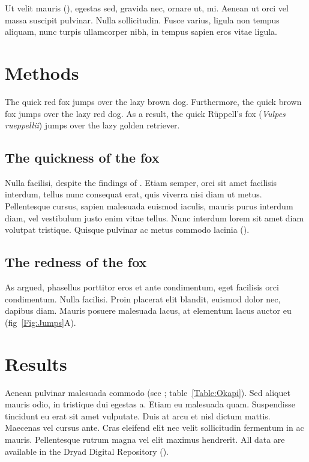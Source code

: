 \documentclass[11pt]{article}
\begin{document}
Ut velit mauris (\citealt{Xiao2015}), egestas sed, gravida nec, ornare 
ut, mi. Aenean ut orci vel massa suscipit pulvinar. Nulla sollicitudin. 
Fusce varius, ligula non tempus aliquam, nunc turpis ullamcorper nibh, 
in tempus sapien eros vitae ligula. 


\section*{Methods}

The quick red fox jumps over the lazy brown dog. Furthermore, the quick 
brown fox jumps over the lazy red dog. As a result, the quick 
R\"{u}ppell's fox (\textit{Vulpes rueppellii}) jumps over the lazy 
golden retriever.

\subsection*{The quickness of the fox}

Nulla facilisi, despite the findings of \citet{LemKapEx07}. Etiam 
semper, orci sit amet facilisis interdum, tellus nunc consequat erat, 
quis viverra nisi diam ut metus. Pellentesque cursus, sapien malesuada 
euismod iaculis, mauris purus interdum diam, vel vestibulum justo enim 
vitae tellus. Nunc interdum lorem sit amet diam volutpat tristique. 
Quisque pulvinar ac metus commodo lacinia (\citealt{Ing11,Xiao2015}).  

\subsection*{The redness of the fox}

As \citet{Xiao2015} argued, phasellus porttitor eros et ante 
condimentum, eget facilisis orci condimentum. Nulla facilisi. Proin 
placerat elit blandit, euismod dolor nec, dapibus diam. Mauris posuere 
malesuada lacus, at elementum lacus auctor eu (fig~\ref{Fig:Jumps}A). 

\section*{Results}

Aenean pulvinar malesuada commodo (see \citealt{DavisEtAl2011}; 
table~\ref{Table:Okapi}). Sed aliquet mauris odio, in tristique dui 
egestas a. Etiam eu malesuada quam. Suspendisse tincidunt eu erat sit 
amet vulputate. Duis at arcu et nisl dictum mattis. Maecenas vel cursus 
ante. Cras eleifend elit nec velit sollicitudin fermentum in ac mauris. 
Pellentesque rutrum magna vel elit maximus hendrerit. All data are 
available in the Dryad Digital Repository (\citealt{CookEtAl2015}).
\end{document}
